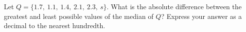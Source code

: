 Let $Q=\{1.7,\ 1.1,\ 1.4,\ 2.1,\ 2.3,\ s\}$. What is the absolute difference between the greatest and least possible values of the median of $Q$? Express your answer as a decimal to the nearest hundredth.
